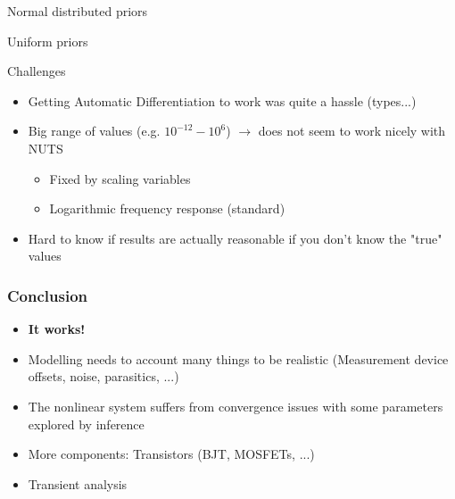 \documentclass{beamer}
\begin{document}
  \begin{frame}{Normal distributed priors}
    
  \end{frame}
  
  \begin{frame}{Uniform priors}
    
  \end{frame}


  \begin{frame}{Challenges}
    \begin{itemize}[<+->]
      \item Getting Automatic Differentiation to work was quite a hassle (types...) \pause
      \item Big range of values (e.g. $10^{-12} - 10^{6}$) $\rightarrow$ does not seem to work nicely with NUTS
      \begin{itemize}
        \item Fixed by scaling variables
        \item Logarithmic frequency response (standard)
      \end{itemize}
      \item Hard to know if results are actually reasonable if you don't know the "true" values
    \end{itemize} 
  \end{frame}

  \begin{frame}
    \frametitle{Conclusion}
    \begin{itemize}
      \item \textbf{It works!}
      \item Modelling needs to account many things to be realistic (Measurement device offsets, noise, parasitics, ...)
      \item The nonlinear system suffers from convergence issues with some parameters explored by inference
      \item More components: Transistors (BJT, MOSFETs, ...)
      \item Transient analysis
    \end{itemize}
  \end{frame}
\end{document}
